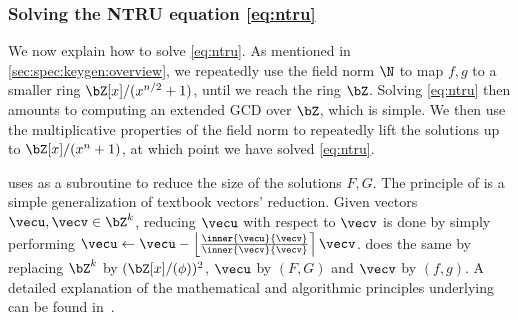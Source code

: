  \subsubsection{Solving the NTRU equation \eqref{eq:ntru}}

 We now explain how to solve \eqref{eq:ntru}. As mentioned in \cref{sec:spec:keygen:overview}, we repeatedly use the field norm $\N$ to map $f,g$ to a smaller ring $\bZ[x]/(x^{n/2}+1)$, until we reach the ring $\bZ$. Solving \eqref{eq:ntru} then amounts to computing an extended GCD over $\bZ$, which is simple. We then use the multiplicative properties of the field norm to repeatedly lift the solutions up to $\bZ[x]/(x^{n}+1)$, at which point we have solved \eqref{eq:ntru}.



  \begin{algorithm}[!htp]
  \caption{$\ntrusolve_{n,q}(f, g)$\hfill}\label{alg:ntrusolve}
 \begin{algorithmic}[1]

  \label{line:botgcd}
  \label{line:botgcd2}
  \EndIf
  \Else

  \label{line:g} 
  \label{line:f}
  \EndIf
  \end{algorithmic}
 \end{algorithm}

 \ntrusolve uses \longreduce as a subroutine to reduce the size of the solutions $F,G$.
 The principle of \reduce is a simple generalization of textbook vectors' reduction. Given vectors $\vecu, \vecv \in \bZ^k$, reducing $\vecu$ with respect to $\vecv$ is done by simply performing $\vecu \gets \vecu - \left\lfloor \frac{ \inner{\vecu}{\vecv} }{ \inner{\vecv}{\vecv} } \right\rceil \vecv$. \reduce does the same by replacing $\bZ^k$ by $(\bZ[x]/(\phi))^2$, $\vecu$ by $(F,G)$ and $\vecv$ by $ (f,g)$. A detailed explanation of the mathematical and algorithmic principles underlying \ntrusolve can be found in~\cite{PKC:PorPre19}.

